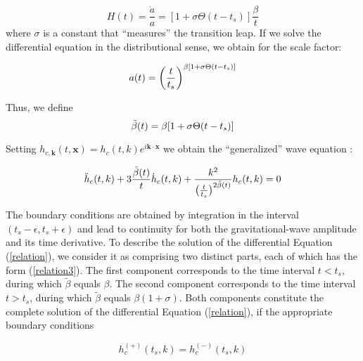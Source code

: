 \documentclass[universe,article,accept,moreauthors,pdftex]{Definitions/mdpi}
\begin{document}
\begin{equation}
     H(t)=\frac{\dot{a}}{a}=[1+\sigma\Theta(t-t_{s})]\frac{\beta}{t}
\end{equation}
where $\sigma$ is a constant that ``measures'' the transition leap. If we solve the differential equation in the distributional sense, we obtain for the scale factor:

\begin{equation}
     a(t)=\bigg{(}\frac{t}{t_{s}}\bigg{)}^{\beta [1+\sigma \Theta(t-t_{s})]}
 \end{equation}

Thus, we define
\begin{equation}
\Tilde{\beta}(t) =\beta [1+\sigma \Theta(t-t_{s})]
\end{equation}

Setting $h_{c,\textbf{k}}(t,\textbf{x})=h_{c}(t,k)e^{i\textbf{k}\cdot \textbf{x}}$ we obtain the ``generalized'' wave equation \cite{DAgostino:2019hvh}:


\begin{equation}\label{relation}
   \ddot{h}_{c}(t,k)+  3 \frac{\tilde{\beta}(t)}{t}\dot{h}_{c}(t,k)+\frac{k^{2}}{\big{(}\frac{t}{t_{s}}\big{)}^{2\tilde{\beta}(t)}}h_{c}(t,k)=0
\end{equation}

The boundary conditions are obtained by integration in the interval $(t_{s}-\epsilon,t_{s}+\epsilon)$ and lead to continuity for both the gravitational-wave amplitude and its time derivative.
To describe the solution of the differential Equation (\ref{relation}), we consider it as comprising two distinct parts, each of which has the form (\ref{relation3}). The first component corresponds to the time interval $t<t_{s}$, during which $\tilde{\beta}$ equals $\beta$. The second component corresponds to the time interval $t>t_{s}$, during which $\tilde{\beta}$ equals $\beta(1+\sigma)$. Both components constitute the complete solution of the differential Equation (\ref{relation}), if the appropriate boundary conditions

\begin{equation}\label{bound0}
h^{(+)}_{c}(t_{s},k)=h^{(-)}_{c}(t_{s},k)
\end{equation}
\end{document}
